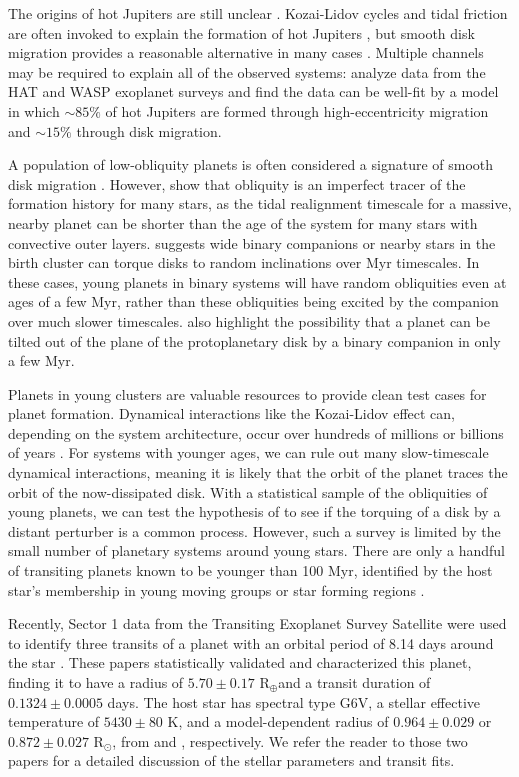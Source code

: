 \documentclass[twocolumn]{aastex63}
\newcommand{\tess}{{\it TESS}}
\newcommand{\rearth}{{R$_\oplus$}}
\newcommand{\rsun}{{R$_\odot$}}
\begin{document}
The origins of hot Jupiters are still unclear \citep{Dawson18}.
Kozai-Lidov cycles and tidal friction are often invoked to explain the formation of hot Jupiters \citep{Fabrycky07}, but smooth disk migration provides a reasonable alternative in many cases \citep{Ida08}. 
Multiple channels may be required to explain all of the observed systems: \citet{Nelson17} analyze data from the HAT and WASP exoplanet surveys and find the data can be well-fit by a model in which ${\sim\!85\%}$ of hot Jupiters are formed through high-eccentricity migration and ${\sim\!15\%}$ through disk migration.

A population of low-obliquity planets is often considered a signature of smooth disk migration \citep{Morton11a, Ford14}. However, \citet{Albrecht12} show that obliquity is an imperfect tracer of the formation history for many stars, as the tidal realignment timescale for a massive, nearby planet can be shorter than the age of the system for many stars with convective outer layers.
\citet{Batygin12} suggests wide binary companions or nearby stars in the birth cluster can torque disks to random inclinations over Myr timescales. In these cases, young planets in binary systems will have random obliquities even at ages of a few Myr, rather than these obliquities being excited by the companion over much slower timescales. \citet{Franchini19} also highlight the possibility that a planet can be tilted out of the plane of the protoplanetary disk by a binary companion in only a few Myr.


Planets in young clusters are valuable resources to provide clean test cases for planet formation. 
Dynamical interactions like the Kozai-Lidov effect can, depending on the system architecture, occur over hundreds of millions or billions of years \citep{Montet15c, Naoz16}. 
For systems with younger ages, we can rule out many slow-timescale dynamical interactions, meaning it is likely that the orbit of the planet traces the orbit of the now-dissipated disk. 
With a statistical sample of the obliquities of young planets, we can test the hypothesis of \citet{Batygin12} to see if the torquing of a disk by a distant perturber is a common process. However, such a survey is limited by the small number of planetary systems around young stars. There are only a handful of transiting planets known to be younger than 100 Myr, identified by the host star's membership in young moving groups or star forming regions \citep{David16, Mann16, David19}.

Recently, Sector 1 data from the Transiting Exoplanet Survey Satellite \citep[\tess, ][]{Ricker14} were used to identify three transits of a planet with an orbital period of 8.14 days around the star  \citep{Benatti19, Newton19}. 
These papers statistically validated and characterized this planet, finding it to have a radius of $5.70 \pm 0.17$ \rearth and a transit duration of $0.1324 \pm 0.0005$ days. 
The host star has spectral type G6V, a stellar effective temperature of $5430 \pm 80$ K, and a model-dependent radius of $0.964 \pm 0.029$ or $0.872 \pm 0.027$ \rsun, from \citet{Newton19} and \citet{Benatti19}, respectively.
We refer the reader to those two papers for a detailed discussion of the stellar parameters and transit fits.
\end{document}
